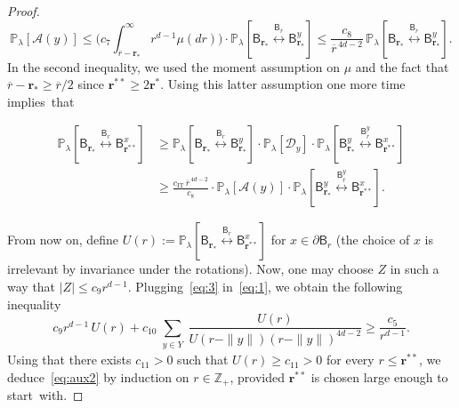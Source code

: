 \documentclass[AHL,Unicode,longabstracts]{cedram}
\newcommand{\rbf}{\mathbf{r}}
\DeclareMathOperator{\IT}{IT}
\DeclareMathOperator{\Fkg}{(FKG)}
\begin{document}
\begin{proof}
\[
{\mathbb P}_\lambda[{\mathcal A}(y)]\le \Big(c_7\int_{\overline r-{\rbf_*}}^\infty r^{d-1}\mu(dr)\Big)\cdot{\mathbb P}_\lambda\left[\mathsf B_{\mathbf r_*} \stackrel{\mathsf B_r}{\longleftrightarrow} \mathsf B_{\rbf_*}^{y}\right]\le \frac{c_8}{\overline r^{\,4d-2}}\,{\mathbb P}_\lambda\left[\mathsf B_{\mathbf r_*} \stackrel{\mathsf B_r}{\longleftrightarrow} \mathsf B_{\rbf_*}^{y}\right].
\]
In the second inequality, we used the moment assumption on $\mu$ and the fact that $\overline r-{\rbf_*}\ge \overline r/2$ since ${\rbf^{**}}\ge2{\rbf^*}$. Using this latter assumption one more time implies~that

\begin{equation}\label{eq:3}
\begin{aligned}
{\mathbb P}_\lambda\left[\mathsf B_{\mathbf r_*} \stackrel{\mathsf B_r}{\longleftrightarrow} \mathsf B_{{\rbf^{**}}}^x\right]&\stackrel{\Fkg}\ge {\mathbb P}_\lambda\left[\mathsf B_{\mathbf r_*} \stackrel{\mathsf B_r}{\longleftrightarrow} \mathsf B_{\rbf_*}^{y}\right]\cdot {\mathbb P}_\lambda[\mathcal D_y] \cdot {\mathbb P}_\lambda\left[\mathsf B^y_{\mathbf r_*} \stackrel{\mathsf B_{\overline r}^y}{\longleftrightarrow} \mathsf B_{{\rbf^{**}}}^x\right]\\
&\stackrel{\phantom{\Fkg}}\ge \frac{{c_{\IT}}\, \overline r^{\,4d-2}}{c_8}\cdot{\mathbb P}_\lambda[{\mathcal A}(y)]\cdot {\mathbb P}_\lambda\left[\mathsf B^y_{\mathbf r_*} \stackrel{\mathsf B_{\overline r}^y}{\longleftrightarrow} \mathsf B_{\rbf^{**}}^x\right].
\end{aligned}
\end{equation}

From now on, define $U(r):= {\mathbb P}_\lambda [\mathsf B_{\mathbf r_*} \stackrel{\mathsf B_r}{\longleftrightarrow} \mathsf B_{\rbf^{**}}^x]$ for $x\in\partial\mathsf B_r$ (the choice of $x$ is irrelevant by invariance under the rotations). Now, one may choose $Z$ in such a way that $|Z|\le c_{9}r^{d-1}$. Plugging~\eqref{eq:3} in~\eqref{eq:1}, we obtain the following inequality
\[
c_{9}r^{d-1}\,U(r)+c_{10}\sum_{\substack{y\in Y}}\frac{U(r)}{U(r-\|y\|)(r-\|y\|)^{4d-2}}\ge \frac{c_5}{r^{d-1}}.
\]
Using that there exists $c_{11}>0$ such that $U(r)\ge c_{11}>0$ for every $r\leq {\rbf^{**}}$, we deduce~\eqref{eq:aux2} by induction on $r\in\mathbb Z_+$, provided ${\rbf^{**}}$ is chosen large enough to start~with.
\end{proof}
\end{document}
